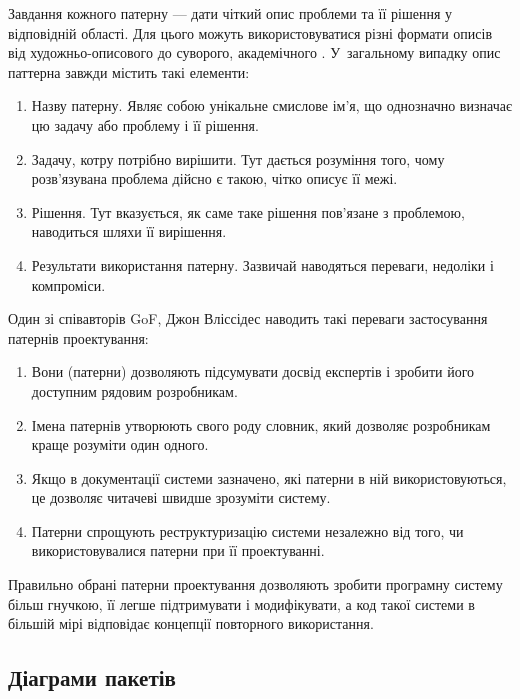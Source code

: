 \documentclass[../main.tex]{subfiles}
\begin{document}
Завдання кожного патерну — дати чіткий опис проблеми та її рішення у відповідній області. Для цього можуть використовуватися різні формати описів від художньо-описового \cite{pattern_language} до суворого, академічного \cite{gof}. У~загальному випадку опис паттерна завжди містить такі елементи:

\begin{enumerate}
	\item Назву патерну. Являє собою унікальне смислове ім'я, що однозначно визначає цю задачу або проблему і її рішення.
	\item Задачу, котру потрібно вирішити. Тут дається розуміння того, чому розв'язувана проблема дійсно є такою, чітко описує її межі.
	\item Рішення. Тут вказується, як саме таке рішення пов'язане з проблемою, наводиться шляхи її вирішення.
	\item Результати використання патерну. Зазвичай наводяться переваги, недоліки і компроміси.
\end{enumerate}

Один зі співавторів GoF, Джон Вліссідес \cite{patterns_application} наводить такі переваги застосування патернів проектування:

\begin{enumerate}
	\item Вони (патерни) дозволяють підсумувати досвід експертів і зробити його доступним рядовим розробникам.
	\item Імена патернів утворюють свого роду словник, який дозволяє розробникам краще розуміти один одного.
	\item Якщо в документації системи зазначено, які патерни в ній використовуються, це дозволяє читачеві швидше зрозуміти систему.
	\item Патерни спрощують реструктуризацію системи незалежно від того, чи використовувалися патерни при її проектуванні.
\end{enumerate}

Правильно обрані патерни проектування дозволяють зробити програмну систему більш гнучкою, її легше підтримувати і модифікувати, а код такої системи в більшій мірі відповідає концепції повторного використання.

\subsection{Діаграми пакетів}
\end{document}
